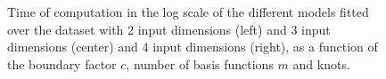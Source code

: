 \documentclass[]{interact}
\theoremstyle{plain}%
\theoremstyle{definition}
\theoremstyle{remark}
\begin{document}
\begin{figure}
\caption{Time of computation in the log scale of the different models fitted over the dataset with 2 input dimensions (left) and 3 input dimensions (center) and 4 input dimensions (right), as a function of the boundary factor $c$, number of basis functions $m$ and knots.}
  \label{fig20_time2D_diabetes}
\end{figure}
\end{document}
